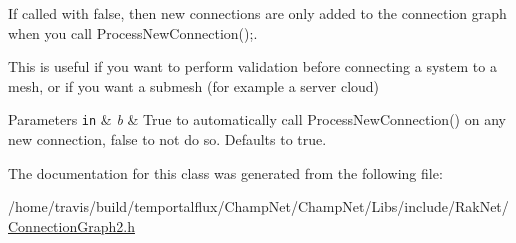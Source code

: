 If called with false, then new connections are only added to the connection graph when you call Process\-New\-Connection();. 

This is useful if you want to perform validation before connecting a system to a mesh, or if you want a submesh (for example a server cloud) 
\begin{DoxyParams}[1]{Parameters}
\mbox{\tt in}  & {\em b} & True to automatically call Process\-New\-Connection() on any new connection, false to not do so. Defaults to true. \\
\hline
\end{DoxyParams}


The documentation for this class was generated from the following file\-:\begin{DoxyCompactItemize}
\item 
/home/travis/build/temportalflux/\-Champ\-Net/\-Champ\-Net/\-Libs/include/\-Rak\-Net/\hyperlink{_connection_graph2_8h}{Connection\-Graph2.\-h}\end{DoxyCompactItemize}
